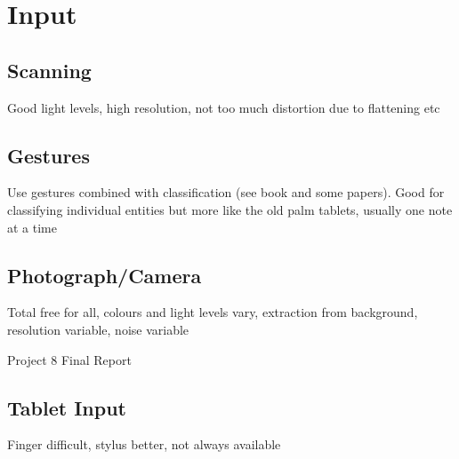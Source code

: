 \section{Input}

\subsection{Scanning}

Good light levels, high resolution, not too much distortion due to flattening etc

\subsection{Gestures}
Use gestures combined with classification (see book and some papers).
Good for classifying individual entities but more like the old palm tablets, usually one note at a time

\subsection{Photograph/Camera}

Total free for all, colours and light levels vary, extraction from background, resolution variable, noise variable

Project 8 Final Report

\subsection{Tablet Input}

Finger difficult, stylus better, not always available
